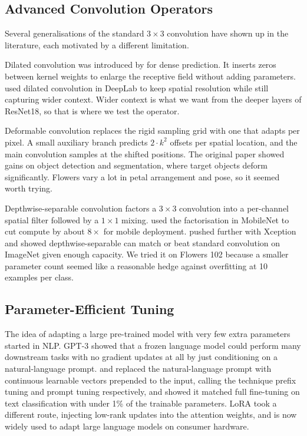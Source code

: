 \subsection{Advanced Convolution Operators}

Several generalisations of the standard $3 \times 3$ convolution have shown up in the literature, each motivated by a different limitation.

Dilated convolution was introduced by \citet{yu2016dilated} for dense prediction. It inserts zeros between kernel weights to enlarge the receptive field without adding parameters. \citet{chen2017deeplab} used dilated convolution in DeepLab to keep spatial resolution while still capturing wider context. Wider context is what we want from the deeper layers of ResNet18, so that is where we test the operator.

Deformable convolution \citep{dai2017deformable} replaces the rigid sampling grid with one that adapts per pixel. A small auxiliary branch predicts $2 \cdot k^2$ offsets per spatial location, and the main convolution samples at the shifted positions. The original paper showed gains on object detection and segmentation, where target objects deform significantly. Flowers vary a lot in petal arrangement and pose, so it seemed worth trying.

Depthwise-separable convolution factors a $3 \times 3$ convolution into a per-channel spatial filter followed by a $1 \times 1$ mixing. \citet{howard2017mobilenets} used the factorisation in MobileNet to cut compute by about $8\times$ for mobile deployment. \citet{chollet2017xception} pushed further with Xception and showed depthwise-separable can match or beat standard convolution on ImageNet given enough capacity. We tried it on Flowers 102 because a smaller parameter count seemed like a reasonable hedge against overfitting at 10 examples per class.

\subsection{Parameter-Efficient Tuning}

The idea of adapting a large pre-trained model with very few extra parameters started in NLP. GPT-3 \citep{brown2020gpt3} showed that a frozen language model could perform many downstream tasks with no gradient updates at all by just conditioning on a natural-language prompt. \citet{li2021prefix} and \citet{lester2021prompt} replaced the natural-language prompt with continuous learnable vectors prepended to the input, calling the technique prefix tuning and prompt tuning respectively, and showed it matched full fine-tuning on text classification with under 1\% of the trainable parameters. LoRA \citep{hu2022lora} took a different route, injecting low-rank updates into the attention weights, and is now widely used to adapt large language models on consumer hardware.

